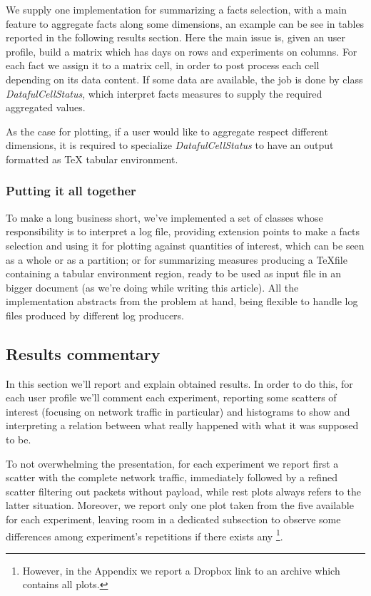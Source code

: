 \documentclass[10pt,a4paper]{article}
\begin{document}
    We supply one implementation for summarizing a facts selection,
    with a main feature to aggregate facts along some dimensions, an
    example can be see in tables reported in the following results
    section. Here the main issue is, given an user profile, build a
    matrix which has days on rows and experiments on columns. For each
    fact we assign it to a matrix cell, in order to post process each
    cell depending on its data content. If some data are available,
    the job is done by class \emph{DatafulCellStatus}, which interpret
    facts measures to supply the required aggregated values.

    As the case for plotting, if a user would like to aggregate
    respect different dimensions, it is required to specialize
    \emph{DatafulCellStatus} to have an output formatted as \TeX
    tabular environment.

    \subsubsection{Putting it all together}
    
    To make a long business short, we've implemented a set of classes
    whose responsibility is to interpret a log file, providing
    extension points to make a facts selection and using it for
    plotting against quantities of interest, which can be seen as a
    whole or as a partition; or for summarizing measures producing a
    \TeX file containing a tabular environment region, ready to be
    used as input file in an bigger document (as we're doing while
    writing this article). All the implementation abstracts from the
    problem at hand, being flexible to handle log files produced by
    different log producers.
    
    \newpage

    \subsection{Results commentary}

    In this section we'll report and explain obtained results. In
    order to do this, for each user profile we'll comment each
    experiment, reporting some scatters of interest (focusing on
    network traffic in particular) and histograms to show and
    interpreting a relation between what really happened with what it
    was supposed to be. 

    To not overwhelming the presentation, for each experiment we
    report first a scatter with the complete network traffic,
    immediately followed by a refined scatter filtering out packets
    without payload, while rest plots always refers to the latter
    situation. Moreover, we report only one plot taken from the five
    available for each experiment, leaving room in a dedicated
    subsection to observe some differences among experiment's
    repetitions if there exists any \footnote{However, in the Appendix
      we report a Dropbox link to an archive which contains all
      plots.}.
\end{document}
